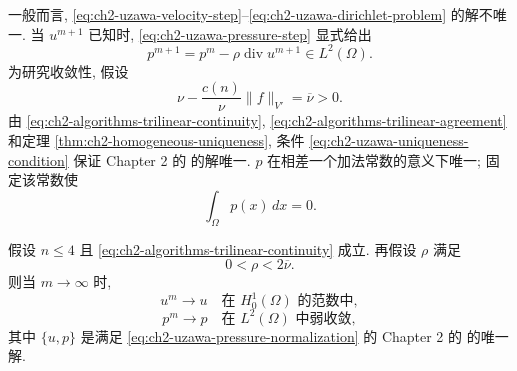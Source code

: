 \hypertarget{chapter-02-page-163}{}
一般而言, \eqref{eq:ch2-uzawa-velocity-step}--\eqref{eq:ch2-uzawa-dirichlet-problem} 的解不唯一. 当 $u^{m+1}$ 已知时, \eqref{eq:ch2-uzawa-pressure-step} 显式给出
\begin{equation}
p^{m+1}=p^m-\rho\operatorname{div}u^{m+1}\in L^2(\Omega).
\label{eq:ch2-uzawa-explicit-pressure}
\end{equation}
为研究收敛性, 假设
\begin{equation}
\nu-\frac{c(n)}\nu\lVert f\rVert_{V'}=\overline\nu>0.
\label{eq:ch2-uzawa-uniqueness-condition}
\end{equation}
由 \eqref{eq:ch2-algorithms-trilinear-continuity}, \eqref{eq:ch2-algorithms-trilinear-agreement} 和定理 \ref{thm:ch2-homogeneous-uniqueness}, 条件 \eqref{eq:ch2-uzawa-uniqueness-condition} 保证 Chapter 2 的  的解唯一. $p$ 在相差一个加法常数的意义下唯一; 固定该常数使
\begin{equation}
\int_\Omega p(x)\,dx=0.
\label{eq:ch2-uzawa-pressure-normalization}
\end{equation}

\begin{Proposition}
\label{prop:ch2-uzawa-convergence}
假设 $n\leq4$ 且 \eqref{eq:ch2-algorithms-trilinear-continuity} 成立. 再假设 $\rho$ 满足
\begin{equation}
0<\rho<2\overline\nu.
\label{eq:ch2-uzawa-step-condition}
\end{equation}
则当 $m\to\infty$ 时,
\begin{equation}
u^m\longrightarrow u\quad\text{在 }H_0^1(\Omega)\text{ 的范数中},
\label{eq:ch2-uzawa-velocity-convergence}
\end{equation}
\begin{equation}
p^m\longrightarrow p\quad\text{在 }L^2(\Omega)\text{ 中弱收敛},
\label{eq:ch2-uzawa-pressure-convergence}
\end{equation}
其中 $\{u,p\}$ 是满足 \eqref{eq:ch2-uzawa-pressure-normalization} 的 Chapter 2 的  的唯一解.
\end{Proposition}


